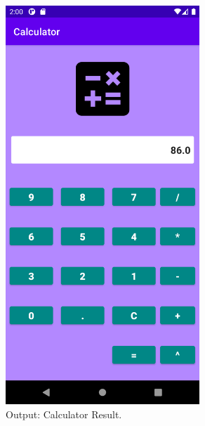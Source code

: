 \documentclass[12pt, a4]{article}
\begin{document}
\subsection*{}
\begin{figure}[h]
\centering
\caption{Output: Calculator Result.}
\includegraphics[height=15cm, width=7.3cm]{Calculator/Screenshots/Calculator-3.png}
\end{figure}

\newpage
\end{document}
